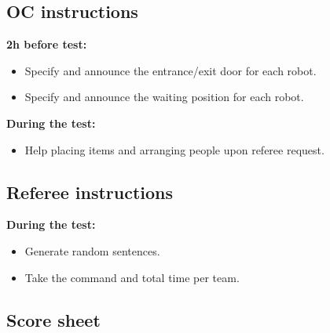 \subsection{OC instructions}
\textbf{2h before test:}
\begin{itemize}
	\item Specify and announce the entrance/exit door for each robot. 
	\item Specify and announce the waiting position for each robot. 
\end{itemize}
\textbf{During the test:}
\begin{itemize}
	\item Help placing items and arranging people upon referee request.
\end{itemize}

\subsection{Referee instructions}
\textbf{During the test:}
\begin{itemize}
	\item Generate random sentences. %
	\item Take the command and total time per team.
\end{itemize}


\newpage
\subsection{Score sheet}


 
